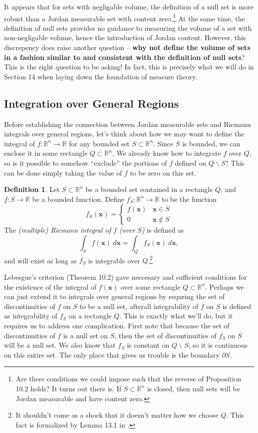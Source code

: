 \documentclass{article}
\newcommand{\R}{\mathbb{R}}
\newcommand{\x}{\mathbf{x}}
\theoremstyle{definition}
\newtheorem{definition}{Definition}[section]
\begin{document}
It appears that for sets with negligable volume, the definition of a null set is more robust than a Jordan measurable set with content zero.\footnote{Are there conditions we could impose such that the reverse of Proposition 10.2 holds? It turns out there is. If $S\subset \R^n$ is closed, then null sets will be Jordan measurable and have content zero.} At the same time, the definition of null sets provides no guidance to measuring the volume of a set with non-negligable volume, hence the introduction of Jordan content. However, this discrepency does raise another question -- \textbf{why not define the volume of sets in a fashion similar to and consistent with the definition of null sets}? This is the right question to be asking! In fact, this is precisely what we will do in Section 14 when laying down the foundation of measure theory.
	
\subsection{Integration over General Regions}

Before establishing the connection between Jordan measurable sets and Riemann integrals over general regions, let's think about how we may want to define the integral of $f:\R^n\to \R$ for any bounded set $S\subset \R^n$. Since $S$ is bounded, we can enclose it in some rectangle $Q\subset \R^n$. We already know how to integrate $f$ over $Q$, so is it possible to somehow ``exclude'' the portions of $f$ defined on $Q\backslash S$? This can be done simply taking the value of $f$ to be zero on this set.

\begin{definition}\label{def10.8}
	Let $S\subset \R^n$ be a bounded set contained in a rectangle $Q$, and $f:S\to\R$ be a bounded function. Define $f_S:\R^n\to \R$ to be the function 
	$$ f_S(\x) = \begin{cases}
		f(\x) & \x\in S\\
		0 &\x\notin S
	\end{cases}$$ The  \textit{\color{red}(multiple) Riemann integral of $ f $ (over $ S$)} is defined as 
	$$ \int_S f(\x)\ d\x = \int_Q f_S(\x) \ d\x,$$ and will exist as long as $f_S$ is integrable over $Q$.\footnote{It shouldn't come as a shock that it doesn't matter how we choose $Q$. This fact is formalized by Lemma 13.1 in \cite{munk1}.}
\end{definition}
	
Lebesgue's criterion (Theorem 10.2) gave neccesary and sufficient conditions for the existence of the integral of $f(\x)$ over some rectangle $Q\subset \R^n$. Perhaps we can just extend it to integrals over general regions by requring the set of discontinuities of $f$ on $S$ to be a null set, afterall integrability of $f$ on $S$ is defined as integrability of $f_S$ on a rectangle $Q$. This is exactly what we'll do, but it requires us to address one complication. First note that because the set of discontinuities of $f$ is a null set on $S$, then the set of discontinuities of $f_S$ on $S$ will be a null set. We also know that $f_S$ is constant on $Q\backslash S$, so it is continuous on this entire set. The only place that gives us trouble is the boundary $\partial S$.
\end{document}
